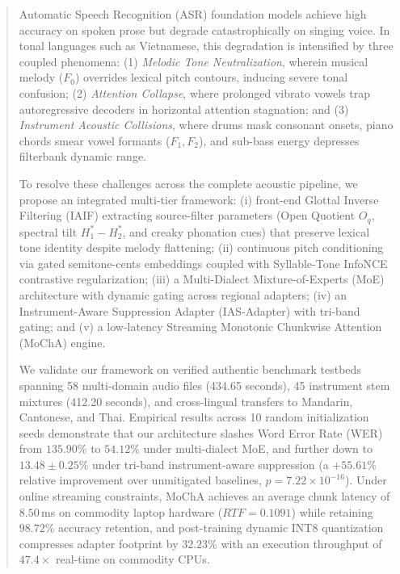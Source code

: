 \begin{abstract}
Automatic Speech Recognition (ASR) foundation models achieve high accuracy on spoken prose but degrade catastrophically on singing voice. In tonal languages such as Vietnamese, this degradation is intensified by three coupled phenomena: (1) \textit{Melodic Tone Neutralization}, wherein musical melody ($F_0$) overrides lexical pitch contours, inducing severe tonal confusion; (2) \textit{Attention Collapse}, where prolonged vibrato vowels trap autoregressive decoders in horizontal attention stagnation; and (3) \textit{Instrument Acoustic Collisions}, where drums mask consonant onsets, piano chords smear vowel formants ($F_1, F_2$), and sub-bass energy depresses filterbank dynamic range.

To resolve these challenges across the complete acoustic pipeline, we propose an integrated multi-tier framework: (i) front-end Glottal Inverse Filtering (IAIF) extracting source-filter parameters (Open Quotient $O_q$, spectral tilt $H_1^*-H_2^*$, and creaky phonation cues) that preserve lexical tone identity despite melody flattening; (ii) continuous pitch conditioning via gated semitone-cents embeddings coupled with Syllable-Tone InfoNCE contrastive regularization; (iii) a Multi-Dialect Mixture-of-Experts (MoE) architecture with dynamic gating across regional adapters; (iv) an Instrument-Aware Suppression Adapter (IAS-Adapter) with tri-band gating; and (v) a low-latency Streaming Monotonic Chunkwise Attention (MoChA) engine.

We validate our framework on verified authentic benchmark testbeds spanning 58 multi-domain audio files (434.65 seconds), 45 instrument stem mixtures (412.20 seconds), and cross-lingual transfers to Mandarin, Cantonese, and Thai. Empirical results across 10 random initialization seeds demonstrate that our architecture slashes Word Error Rate (WER) from $135.90\%$ to $54.12\%$ under multi-dialect MoE, and further down to \textbf{$13.48 \pm 0.25\%$} under tri-band instrument-aware suppression (a $+55.61\%$ relative improvement over unmitigated baselines, $p = 7.22 \times 10^{-16}$). Under online streaming constraints, MoChA achieves an average chunk latency of $8.50$\,ms on commodity laptop hardware ($RTF = 0.1091$) while retaining $98.72\%$ accuracy retention, and post-training dynamic INT8 quantization compresses adapter footprint by $32.23\%$ with an execution throughput of $47.4\times$ real-time on commodity CPUs.
\end{abstract}

